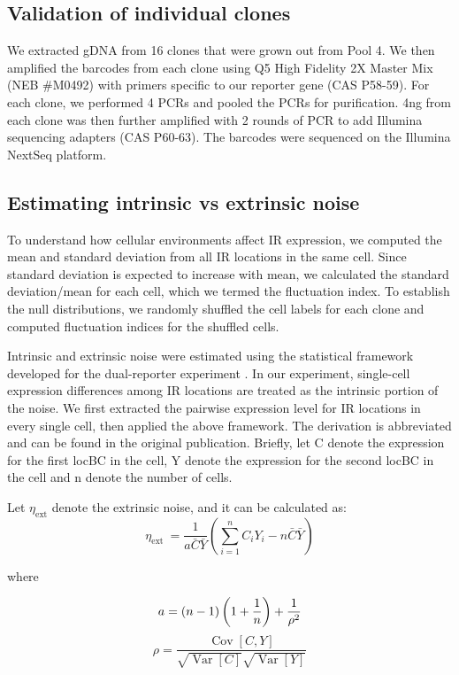 \subsection*{Validation of individual clones}

We extracted gDNA from 16 clones that were grown out from Pool 4. We then amplified the barcodes from each clone using Q5 High Fidelity 2X Master Mix (NEB \#M0492) with primers specific to our reporter gene (CAS P58-59). For each clone, we performed 4 PCRs and pooled the PCRs for purification. 4ng from each clone was then further amplified with 2 rounds of PCR to add Illumina sequencing adapters (CAS P60-63). The barcodes were sequenced on the Illumina NextSeq platform. 

\subsection*{Estimating intrinsic vs extrinsic noise}

To understand how cellular environments affect IR expression, we computed the mean and standard deviation from all IR locations in the same cell. Since standard deviation is expected to increase with mean, we calculated the standard deviation/mean for each cell, which we termed the fluctuation index. To establish the null distributions, we randomly shuffled the cell labels for each clone and computed fluctuation indices for the shuffled cells. 

Intrinsic and extrinsic noise were estimated using the statistical framework developed for the dual-reporter experiment \cite{fuaq_pachterl:EstimatingIntrinsic2016}. In our experiment, single-cell expression differences among IR locations are treated as the intrinsic portion of the noise. We first extracted the pairwise expression level for IR locations in every single cell, then applied the above framework. The derivation is abbreviated and can be found in the original publication. Briefly, let C denote the expression for the first locBC in the cell, Y denote the expression for the second locBC in the cell and n denote the number of cells. 

Let $\eta_{\text {ext}}$ denote the extrinsic noise, and it can be calculated as:
$$
\eta_{\text {ext }}=\frac{1}{a \bar{C} \bar{Y}}\left(\sum_{i=1}^n C_i Y_i-n \bar{C} \bar{Y}\right)
$$
\centerline{where}
$$
a=(n-1)\left(1+\frac{1}{n}\right)+\frac{1}{\rho^2} \\
$$
$$
\rho=\frac{\operatorname{Cov}[C, Y]}{\sqrt{\operatorname{Var}[C]} \sqrt{\operatorname{Var}[Y]}}
$$
\\

